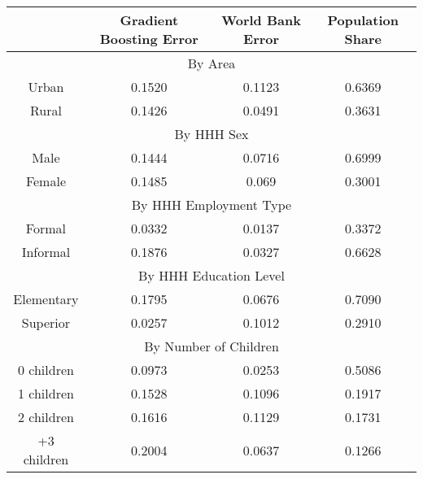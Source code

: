 \begin{table}[]
\begin{tabular}{@{}cccc@{}}
\toprule
            & Gradient Boosting Error & World Bank Error & Population Share \\ \midrule
\multicolumn{4}{c}{By Area}                                                 \\ \midrule
Urban       & 0.1520                  & 0.1123           & 0.6369           \\
Rural       & 0.1426                  & 0.0491           & 0.3631           \\ \midrule
\multicolumn{4}{c}{By HHH Sex}                                              \\ \midrule
Male        & 0.1444                  & 0.0716           & 0.6999           \\
Female      & 0.1485                  & 0.069            & 0.3001           \\ \midrule
\multicolumn{4}{c}{By HHH Employment Type}                                  \\ \midrule
Formal      & 0.0332                  & 0.0137           & 0.3372           \\
Informal    & 0.1876                  & 0.0327           & 0.6628           \\ \midrule
\multicolumn{4}{c}{By HHH Education Level}                                  \\ \midrule
Elementary  & 0.1795                  & 0.0676           & 0.7090           \\
Superior    & 0.0257                  & 0.1012           & 0.2910           \\ \midrule
\multicolumn{4}{c}{By Number of Children}                                   \\ \midrule
0 children  & 0.0973                  & 0.0253           & 0.5086           \\
1 children  & 0.1528                  & 0.1096           & 0.1917           \\
2 children  & 0.1616                  & 0.1129           & 0.1731           \\
+3 children & 0.2004                  & 0.0637           & 0.1266          
\end{tabular}
\end{table}